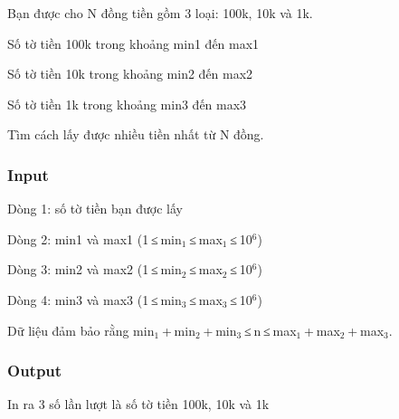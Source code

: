 

Bạn được cho N đồng tiền gồm 3 loại: 100k, 10k và 1k.

Số tờ tiền 100k trong khoảng min1 đến max1

Số tờ tiền 10k trong khoảng min2 đến max2

Số tờ tiền 1k trong khoảng min3 đến max3

Tìm cách lấy được nhiều tiền nhất từ N đồng.

\subsubsection{Input}

Dòng 1: số tờ tiền bạn được lấy

Dòng 2: min1 và max1 (1 ≤ min$_1$ ≤ max$_1$ ≤ 10$^6$)

Dòng 3: min2 và max2 (1 ≤ min$_2$ ≤ max$_2$ ≤ 10$^6$)

Dòng 4: min3 và max3 (1 ≤ min$_3$ ≤ max$_3$ ≤ 10$^6$)

Dữ liệu đảm bảo rằng min$_1$ + min$_2$ + min$_3$ ≤ n ≤ max$_1$ + max$_2$ + max$_3$.

\subsubsection{Output}

In ra 3 số lần lượt là số tờ tiền 100k, 10k và 1k

